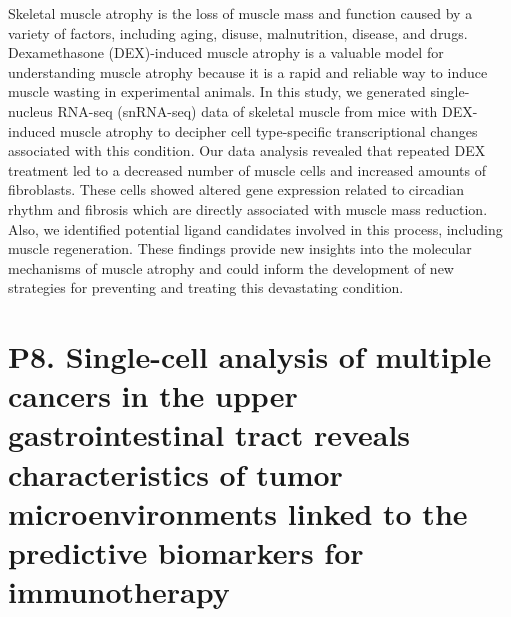 \noindent
Skeletal muscle atrophy is the loss of muscle mass and function caused by a variety of factors, including aging, disuse, malnutrition, disease, and drugs. Dexamethasone (DEX)-induced muscle atrophy is a valuable model for understanding muscle atrophy because it is a rapid and reliable way to induce muscle wasting in experimental animals. In this study, we generated single-nucleus RNA-seq (snRNA-seq) data of skeletal muscle from mice with DEX-induced muscle atrophy to decipher cell type-specific transcriptional changes associated with this condition. Our data analysis revealed that repeated DEX treatment led to a decreased number of muscle cells and increased amounts of fibroblasts. These cells showed altered gene expression related to circadian rhythm and fibrosis which are directly associated with muscle mass reduction. Also, we identified potential ligand candidates involved in this process, including muscle regeneration. These findings provide new insights into the molecular mechanisms of muscle atrophy and could inform the development of new strategies for preventing and treating this devastating condition.
\newpage


\section*{P8. Single-cell analysis of multiple cancers in the upper gastrointestinal tract reveals characteristics of tumor microenvironments linked to the predictive biomarkers for immunotherapy}

